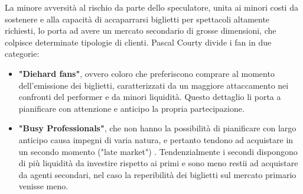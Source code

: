 La minore avversità al rischio da parte dello speculatore, unita ai minori costi da sostenere e alla capacità di accaparrarsi biglietti per spettacoli altamente richiesti, lo porta ad avere un mercato secondario di grosse dimensioni, che colpisce determinate tipologie di clienti.
Pascal Courty \cite{courty2003some} divide i fan in due categorie: 
\begin{itemize}
	\item \textbf{"Diehard fans"}, ovvero coloro che preferiscono comprare al momento dell'emissione dei biglietti, caratterizzati da un maggiore attaccamento nei confronti del performer e da minori liquidità. Questo dettaglio li porta a pianificare con attenzione e anticipo la propria partecipazione. 
	\item \textbf{"Busy Professionals"}, che non hanno la possibilità di pianificare con largo anticipo causa impegni di varia natura, e pertanto tendono ad acquistare in un secondo momento ("late market") . Tendenzialmente i secondi dispongono di più liquidità da investire rispetto ai primi e sono meno restii ad acquistare da agenti secondari, nel caso la reperibilità dei biglietti sul mercato primario venisse meno.
\end{itemize}

